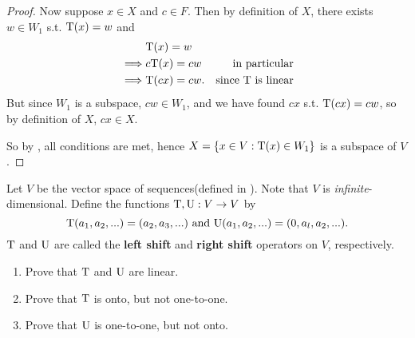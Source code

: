 \begin{proof}
Now suppose \(x \in X\) and \(c \in F\).
Then by definition of \(X\), there exists \(w \in W_1\) s.t. \(\mathrm{T}(x) = w\) and
\begin{align*}
             & \mathrm{T}(x) = w \\
    \implies & c\mathrm{T}(x) = cw & \text{in particular} \\
    \implies & \mathrm{T}(cx) = cw. & \text{since \(\mathrm{T}\) is linear}
\end{align*}
But since \(W_1\) is a subspace, \(cw \in W_1\), and we have found \(cx\) s.t. \(\mathrm{T}(cx) = cw\), so by definition of \(X\), \(cx \in X\).

So by , all conditions are met, hence \(X = \{ x \in V: \mathrm{T}(x) \in W_1 \}\) is a subspace of \(V\).
\end{proof}

\begin{exercise} \label{exercise 2.1.21}
Let \(V\) be the vector space of sequences(defined in ).
Note that \(V\) is \emph{infinite}-dimensional.
Define the functions \(\mathrm{T}, \mathrm{U}: V \to V\) by
\[
    \mathrm{T}(a_1, a_2, ...) = (a_2, a_3, ...) \text{ and } \mathrm{U}(a_1, a_2, ...) = (0, a_l, a_2, ...).
\]
\(\mathrm{T}\) and \(\mathrm{U}\) are called the \textbf{left shift} and \textbf{right shift} operators on \(V\), respectively.
\begin{enumerate}
\item Prove that \(\mathrm{T}\) and \(\mathrm{U}\) are linear.
\item Prove that \(\mathrm{T}\) is onto, but not one-to-one.
\item Prove that \(\mathrm{U}\) is one-to-one, but not onto.
\end{enumerate}
\end{exercise}

